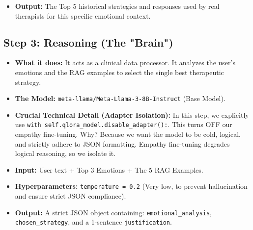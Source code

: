 \documentclass[12pt,a4paper]{article}
\begin{document}
\begin{itemize}
\begin{enumerate}
        \item \textbf{The Math (Reranking):} It calculates a final score for each candidate: $\text{Weighted Score} = (1.0 - \text{Cosine Distance}) \times \text{Emotion Probability}$. It then removes duplicates, sorts them by this weighted score, and returns the final Top 5.
    \end{enumerate}
    \item \textbf{Output:} The Top 5 historical strategies and responses used by real therapists for this specific emotional context.
\end{itemize}

\subsection{Step 3: Reasoning (The "Brain")}
\begin{itemize}
    \item \textbf{What it does:} It acts as a clinical data processor. It analyzes the user's emotions and the RAG examples to select the single best therapeutic strategy.
    \item \textbf{The Model:} \texttt{meta-llama/Meta-Llama-3-8B-Instruct} (Base Model).
    \item \textbf{Crucial Technical Detail (Adapter Isolation):} In this step, we explicitly use \texttt{with self.qlora\_model.disable\_adapter():}. This turns OFF our empathy fine-tuning. Why? Because we want the model to be cold, logical, and strictly adhere to JSON formatting. Empathy fine-tuning degrades logical reasoning, so we isolate it.
    \item \textbf{Input:} User text + Top 3 Emotions + The 5 RAG Examples.
    \item \textbf{Hyperparameters:} \texttt{temperature = 0.2} (Very low, to prevent hallucination and ensure strict JSON compliance).
    \item \textbf{Output:} A strict JSON object containing: \texttt{emotional\_analysis}, \texttt{chosen\_strategy}, and a 1-sentence \texttt{justification}.
\end{itemize}
\end{document}
